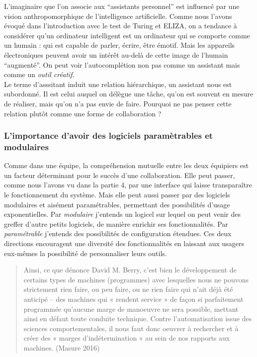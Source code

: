 \documentclass[]{article}
\begin{document}
L'imaginaire que l'on associe aux ``assistants personnel'' est influencé
par une vision anthropomorphique de l'intelligence artificielle. Comme
nous l'avons évoqué dans l'introduction avec le test de Turing et ELIZA,
on a tendance à considérer qu'un ordinateur intelligent est un
ordinateur qui se comporte comme un humain : qui est capable de parler,
écrire, être émotif. Mais les appareils électroniques peuvent avoir un
intérêt au-delà de cette image de l'humain ``augmenté''. On peut voir
l'autocomplétion non pas comme un assistant mais comme un \emph{outil
créatif}.\\
Le terme d'asssitant induit une relation hiérarchique, un assistant nous
est subordonné. Il est celui auquel on délègue une tâche, qu'on est
souvent en mesure de réaliser, mais qu'on n'a pas envie de faire.
Pourquoi ne pas penser cette relation plutôt comme une forme de
collaboration ?

\hypertarget{limportance-davoir-des-logiciels-paramuxe8trables-et-modulaires}{%
\subsubsection{L'importance d'avoir des logiciels paramètrables et
modulaires}\label{limportance-davoir-des-logiciels-paramuxe8trables-et-modulaires}}

Comme dans une équipe, la compréhension mutuelle entre les deux
équipiers est un facteur déterminant pour le succès d'une collaboration.
Elle peut passer, comme nous l'avons vu dans la partie 4, par une
interface qui laisse transparaître le fonctionnement du système. Mais
elle peut aussi passer par des logiciels modulaires et aisément
paramétrables, permettant des possibilités d'usage exponentielles. Par
\emph{modulaire} j'entends un logicel sur lequel on peut venir des
greffer d'autre petits logiciels, de manière enrichir ses
fonctionnalités. Par \emph{paramétrable} j'entends des possibilités de
configuration étendues. Ces deux directions encouragent une diversité
des fonctionnalités en laissant aux usagers eux-mêmes la possibilité de
personnaliser leurs outils.

\begin{quote}
Ainsi, ce que dénonce David M. Berry, c'est bien le développement de
certains types de machines (programmes) avec lesquelles nous ne pouvons
strictement rien faire, ou peu faire, ou ne rien faire qui n'ait déjà
été anticipé -- des machines qui « rendent service » de façon si
parfaitement programmée qu'aucune marge de manoeuvre ne sera possible,
mettant ainsi en défaut toute conduite technique. Contre
l'automatisation issue des sciences comportementales, il nous faut donc
oeuvrer à rechercher et à créer des « marges d'indétermination » au sein
de nos rapports aux machines. (Masure 2016)
\end{quote}
\end{document}
